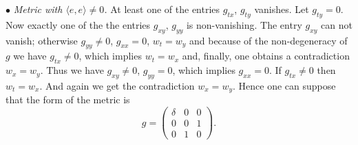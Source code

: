 \documentclass[pdftex]{sigma}
\begin{document}
$\bullet$ {\it Metric with $\langle e,e\rangle \ne 0$.}
At least one of the entries $g_{tx}$, $g_{ty}$ vanishes. Let $g_{ty}=0$.
Now exactly one of the the entries $g_{xy}$, $g_{yy}$ is non-vanishing.
The entry $g_{xy}$ can not vanish; otherwise $g_{yy}\ne 0$, $g_{xx}=0$, $w_t=w_y$
and because of the non-degeneracy of $g$ we have $g_{tx}\ne 0$,
which implies $w_t=w_x$ and, f\/inally, one obtains a contradiction $w_x=w_y$.
Thus we have $g_{xy}\ne 0$, $g_{yy}=0$, which implies $g_{xx}=0$.
If $g_{tx}\ne 0$ then $w_t=w_x$. And again we get the contradiction $w_x=w_y$.
Hence one can suppose that the form of the metric is
\[g=
\begin{pmatrix}
\delta & 0 & 0\\
0 & 0 & 1 \\
0 & 1 & 0
\end{pmatrix}.
\]
\end{document}
